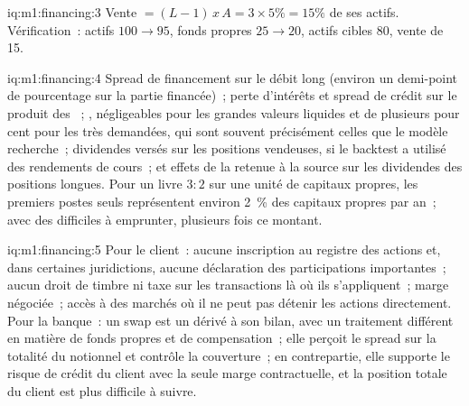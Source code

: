 \begin{solution}{iq:m1:financing:3}
Vente $= (L-1)\,x\,A = 3 \times 5\% = 15\%$ de ses actifs. Vérification~:
actifs $100 \to 95$, fonds propres $25 \to 20$, actifs cibles 80, vente de 15.
\end{solution}

\begin{solution}{iq:m1:financing:4}
Spread de financement sur le débit long (environ un demi-point de pourcentage
sur la partie financée)~; perte d'intérêts et spread de crédit sur le produit
des ~; , négligeables pour les grandes valeurs
liquides et de plusieurs pour cent pour les  très demandées,
qui sont souvent précisément celles que le modèle recherche~; dividendes versés
sur les positions vendeuses, si le backtest a utilisé des rendements de cours~;
et effets de la retenue à la source sur les dividendes des positions longues. Pour un livre $3{:}2$ sur une unité de capitaux propres, les premiers postes seuls représentent environ 2~\% des capitaux propres par an~; avec des  difficiles à emprunter, plusieurs fois ce montant.
\end{solution}

\begin{solution}{iq:m1:financing:5}
Pour le client~: aucune inscription au registre des actions et, dans certaines juridictions,
aucune déclaration des participations importantes~; aucun droit de timbre ni taxe sur les transactions là où ils s'appliquent~;
marge négociée~; accès à des marchés où il ne peut pas détenir les actions directement.
Pour la banque~: un swap est un dérivé à son bilan, avec un traitement différent en matière de fonds propres et de compensation~;
elle perçoit le spread sur la totalité du notionnel et contrôle la couverture~;
en contrepartie, elle supporte le risque de crédit du client avec la seule marge contractuelle,
et la position totale du client est plus difficile à suivre.
\end{solution}

